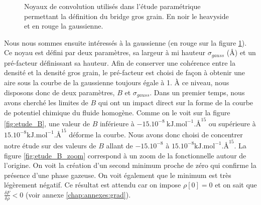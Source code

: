 
\begin{figure}[ht]
    \center    
    \caption[Noyaux de convolution utilisés dans l'étude paramétrique permettant la définition du bridge gros grain.]{Noyaux de convolution utilisés dans l'étude paramétrique permettant la définition du bridge gros grain. En noir le heavyside et en rouge la gaussienne.}
    \label{fig:noyaux}
\end{figure}



Nous nous sommes ensuite intéressés à la gaussienne (en rouge sur la figure \ref{fig:noyaux}).
Ce noyau est défini par deux paramètres, sa largeur à mi hauteur $\sigma_{gauss}$ (\AA) et un pré-facteur définissant sa hauteur.
Afin de conserver une cohérence entre la densité et la densité gros grain, le pré-facteur est choisi de façon à obtenir une aire sous la courbe de la gaussienne toujours égale à 1.
\`A ce niveau, nous disposons donc de deux paramètres, $B$ et $\sigma_{gauss}$.
Dans un premier temps, nous avons cherché les limites de $B$ qui ont un impact direct sur la forme de la courbe de potentiel chimique du fluide homogène.
Comme on le voit sur la figure \ref{fig:etude_B}, une valeur de $B$ inférieure à $-15.10^{-8}\  \mathrm{kJ.mol}^{-1}.\text{\AA}^{15}$ ou supérieure à $15.10^{-8} \mathrm{kJ.mol}^{-1}.\text{\AA}^{15}$ déforme la courbe.
Nous avons donc choisi de concentrer notre étude sur des valeurs de $B$ allant de $-15.10^{-8}$ à $15.10^{-8} \mathrm{kJ.mol}^{-1}.\text{\AA}^{15}$.
La figure \ref{fig:etude_B_zoom} correspond à un zoom de la fonctionnelle autour de l'origine. On voit la création d'un second minimum proche de zéro qui confirme la présence d'une phase gazeuse. On voit également que le minimum est très légèrement négatif. Ce résultat est attendu car on impose $\rho[0]=0$ et on sait que $\frac{\delta F}{\delta \rho}<0$ (voir annexe \ref{chap:annexes:grad}).

